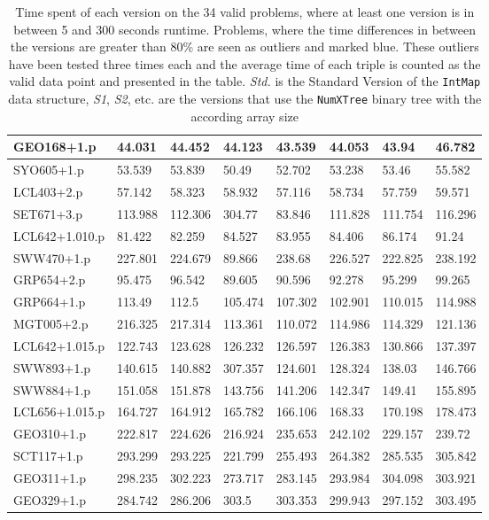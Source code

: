 \documentclass[]{ceurart}
\begin{document}
\begin{table}[!ht]
\begin{tabular}{|l|l|l|l|l|l|l|l|}
        GEO168+1.p & 44.031 & 44.452 & 44.123 & 43.539 & 44.053 & 43.94 & 46.782 \\ \hline
        SYO605+1.p & 53.539 & 53.839 & 50.49 & 52.702 & 53.238 & 53.46 & 55.582 \\ \hline
        LCL403+2.p & 57.142 & 58.323 & 58.932 & 57.116 & 58.734 & 57.759 & 59.571 \\ \hline
        {\color{blue} SET671+3.p} & 113.988 & 112.306 & 304.77 & 83.846 & 111.828 & 111.754 & 116.296 \\ \hline
        LCL642+1.010.p & 81.422 & 82.259 & 84.527 & 83.955 & 84.406 & 86.174 & 91.24 \\ \hline
        {\color{blue} SWW470+1.p} & 227.801 & 224.679 & 89.866 & 238.68 & 226.527 & 222.825 & 238.192 \\ \hline
        GRP654+2.p & 95.475 & 96.542 & 89.605 & 90.596 & 92.278 & 95.299 & 99.265 \\ \hline
        GRP664+1.p & 113.49 & 112.5 & 105.474 & 107.302 & 102.901 & 110.015 & 114.988 \\ \hline
        {\color{blue} MGT005+2.p} & 216.325 & 217.314 & 113.361 & 110.072 & 114.986 & 114.329 & 121.136 \\ \hline
        LCL642+1.015.p & 122.743 & 123.628 & 126.232 & 126.597 & 126.383 & 130.866 & 137.397 \\ \hline
        {\color{blue} SWW893+1.p} & 140.615 & 140.882 & 307.357 & 124.601 & 128.324 & 138.03 & 146.766 \\ \hline
        SWW884+1.p & 151.058 & 151.878 & 143.756 & 141.206 & 142.347 & 149.41 & 155.895 \\ \hline
        LCL656+1.015.p & 164.727 & 164.912 & 165.782 & 166.106 & 168.33 & 170.198 & 178.473 \\ \hline
        GEO310+1.p & 222.817 & 224.626 & 216.924 & 235.653 & 242.102 & 229.157 & 239.72 \\ \hline
        SCT117+1.p & 293.299 & 293.225 & 221.799 & 255.493 & 264.382 & 285.535 & 305.842 \\ \hline
        GEO311+1.p & 298.235 & 302.223 & 273.717 & 283.145 & 293.984 & 304.098 & 303.921 \\ \hline
        GEO329+1.p & 284.742 & 286.206 & 303.5 & 303.353 & 299.943 & 297.152 & 303.495 \\ \hline
    \end{tabular}
  \caption{
    Time spent of each version on the 34 valid problems, where at least one
    version is in between 5 and 300 seconds runtime. Problems, where the time
    differences in between the versions are greater than 80\% are seen as
    outliers and marked blue. These outliers have been tested three times each
    and the average time of each triple is counted as the valid data point and presented
    in the table. \textit{Std.} is the Standard Version of the \texttt{IntMap}
    data structure, \textit{S1}, \textit{S2}, etc. are the versions that use
    the \texttt{NumXTree} binary tree with the according array size
    }
  \label{tab:filtered_results}
\end{table}
\end{document}
